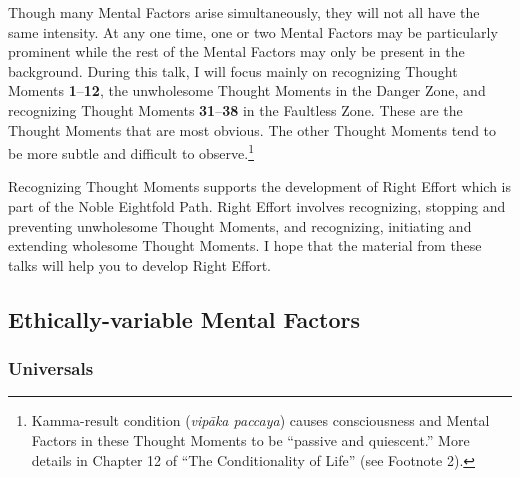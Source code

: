 Though many Mental Factors arise simultaneously, they will not all have the same intensity. At any one time, one or two Mental Factors may be particularly prominent while the rest of the Mental Factors may only be present in the background. During this talk, I will focus mainly on recognizing Thought Moments \textbf{1}--\textbf{12}, the unwholesome Thought Moments in the Danger Zone, and recognizing Thought Moments \textbf{31}--\textbf{38} in the Faultless Zone. These are the Thought Moments that are most obvious. The other Thought Moments tend to be more subtle and difficult to observe.\footnote{Kamma-result condition (\textit{vipāka paccaya}) causes consciousness and Mental Factors in these Thought Moments to be “passive and quiescent.” More details in Chapter 12 of “The Conditionality of Life” (see Footnote 2).}

Recognizing Thought Moments supports the development of Right Effort which is part of the Noble Eightfold Path. Right Effort involves recognizing, stopping and preventing unwholesome Thought Moments, and recognizing, initiating and extending wholesome Thought Moments. I hope that the material from these talks will help you to develop Right Effort.

\subsection*{Ethically-variable Mental Factors}

\subsubsection*{Universals}

